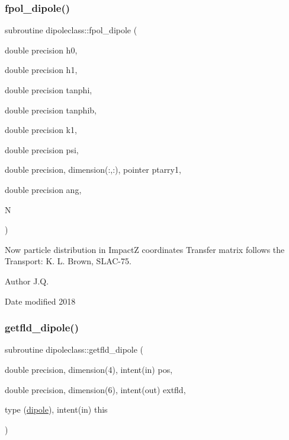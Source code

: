 \subsubsection{\texorpdfstring{fpol\_dipole()}{fpol\_dipole()}}
{\footnotesize\ttfamily subroutine dipoleclass\+::fpol\+\_\+dipole (\begin{DoxyParamCaption}\item[{double precision}]{h0,  }\item[{double precision}]{h1,  }\item[{double precision}]{tanphi,  }\item[{double precision}]{tanphib,  }\item[{double precision}]{k1,  }\item[{double precision}]{psi,  }\item[{double precision, dimension(\+:,\+:), pointer}]{ptarry1,  }\item[{double precision}]{ang,  }\item[{}]{N }\end{DoxyParamCaption})}



Now particle distribution in ImpactZ coordinates Transfer matrix follows the Transport\+: K. L. Brown, S\+L\+A\+C-\/75. 

\begin{DoxyAuthor}{Author}
J.\+Q. 
\end{DoxyAuthor}
\begin{DoxyDate}{Date}
modified 2018 
\end{DoxyDate}
\mbox{\label{namespacedipoleclass_ac8c755e07904e113f223ee5ef029ac93}} 
\subsubsection{\texorpdfstring{getfld\_dipole()}{getfld\_dipole()}}
{\footnotesize\ttfamily subroutine dipoleclass\+::getfld\+\_\+dipole (\begin{DoxyParamCaption}\item[{double precision, dimension(4), intent(in)}]{pos,  }\item[{double precision, dimension(6), intent(out)}]{extfld,  }\item[{type (\mbox{\hyperlink{namespacedipoleclass_structdipoleclass_1_1dipole}{dipole}}), intent(in)}]{this }\end{DoxyParamCaption})}



